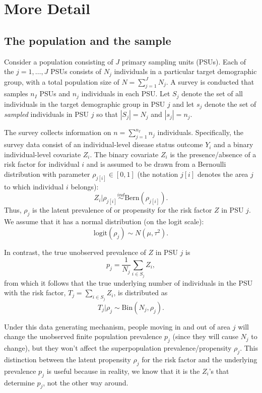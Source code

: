 \documentclass[10pt,a4paper]{article}
\newcommand*{\red}{\textcolor{red}}
\begin{document}
\section*{More Detail}
\subsection*{The population and the sample}
Consider a population consisting of $J$ primary sampling units (PSUs). Each of the $j = 1, \ldots, J$ PSUs consists of $N_j$ individuals in a particular target demographic group, with a total population size of $N = \sum_{j=1}^J N_j$. A survey is conducted that samples $n_I$ PSUs and $n_j$ individuals in each PSU. Let $S_j$ denote the set of all individuals in the target demographic group in PSU $j$ and let $s_j$ denote the set of \textit{sampled} individuals in PSU $j$ so that $|S_j| = N_j$ and $|s_j| = n_j$.

The survey collects information on $n = \sum_{j=1}^{n_I} n_j$ individuals. Specifically, the survey data consist of an individual-level disease status outcome $Y_i$ and a binary individual-level covariate $Z_i$. The binary covariate $Z_i$ is the presence/absence of a risk factor for individual $i$ and is assumed to be drawn from a Bernoulli distribution with parameter $\rho_{j[i]} \in [0,1]$ (the notation $j[i]$ denotes the area $j$ to which individual $i$ belongs):
\[
	Z_i | \rho_{j[i]} \overset{ind}{\sim} \textrm{Bern}(\rho_{j[i]}).
\]
Thus, $\rho_j$ is the latent prevalence of or propensity for the risk factor $Z$ in PSU $j$. We assume that it has a normal distribution (on the logit scale):
\[
	\textrm{logit}(\rho_j) \sim N(\mu, \tau^2).
\]

In contrast, the true unobserved prevalence of $Z$ in PSU $j$ is
\[
	p_j = \frac{1}{N_j} \sum_{i \in S_j} Z_i,
\]
from which it follows that the true underlying number of individuals in the PSU with the risk factor, $T_j = \sum_{i \in S_j} Z_i$, is distributed as
\[
	T_j | \rho_j \sim \mathrm{Bin}(N_j, \rho_j).
\]

Under this data generating mechanism, people moving in and out of area $j$ will change the unobserved finite population prevalence $p_j$ (since they will cause $N_j$ to change), but they won't affect the superpopulation prevalence/propensity $\rho_j$. This distinction between the latent propensity $\rho_j$ for the risk factor and the underlying prevalence $p_j$ is useful because in reality, we know that it is the $Z_i$'s that determine $p_j$, not the other way around.
\end{document}
